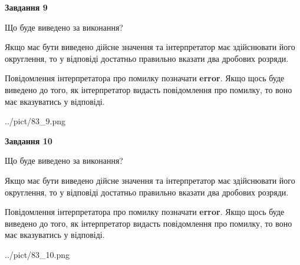 \documentclass[12pt, ukrainian]{article}
\begin{document}
{\begin {Large}
{\begin {center}\textbf{Завдання 9}\end {center}}\par
Що буде виведено за виконання? \par

Якщо має бути виведено дійсне значення та інтерпретатор має здійснювати його округлення, 
то у відповіді достатньо правильно вказати два дробових розряди.

Повідомлення інтерпретатора про помилку позначати \textbf{error}.
Якщо щось буде виведено до того, як інтерпретатор видасть повідомлення про помилку, 
то воно має вказуватись у відповіді. \par

\begin{center}
	{../pict/83_9.png}
\end{center}
\newpage

{\begin {center}\textbf{Завдання 10}\end {center}}\par
Що буде виведено за виконання? \par

Якщо має бути виведено дійсне значення та інтерпретатор має здійснювати його округлення, 
то у відповіді достатньо правильно вказати два дробових розряди.

Повідомлення інтерпретатора про помилку позначати \textbf{error}.
Якщо щось буде виведено до того, як інтерпретатор видасть повідомлення про помилку, 
то воно має вказуватись у відповіді. \par

\begin{center}
	{../pict/83_10.png}
\end{center}
\newpage

\end {Large}}
\end{document}
